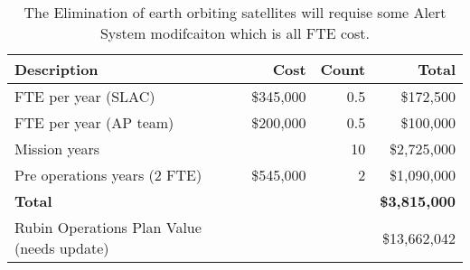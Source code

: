 \tiny \begin{longtable} {|l|r|r|r|} \caption{The Elimination of earth orbiting satellites will requise some Alert System modifcaiton which is all FTE cost. \label{tab:eliminate}}\\ 
\hline 
\textbf{Description}&\textbf{Cost}&\textbf{Count}&\textbf{Total} \\ \hline
{FTE per year (SLAC)}&{\$345,000}&{0.5}&{\$172,500} \\ \hline
{FTE per year (AP team)}&{\$200,000}&{0.5}&{\$100,000} \\ \hline
{Mission years}&{}&{10}&{\$2,725,000} \\ \hline
{Pre operations years (2 FTE)}&{\$545,000}&{2}&{\$1,090,000} \\ \hline
\textbf{Total }&\textbf{}&\textbf{}&\textbf{\$3,815,000} \\ \hline
{Rubin Operations Plan Value (needs update)}&{}&{}&{\$13,662,042} \\ \hline
\end{longtable} \normalsize
